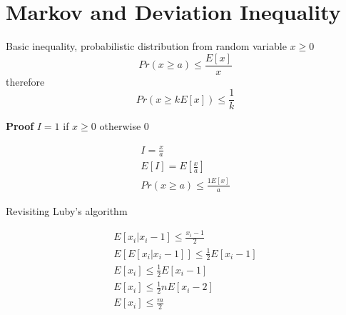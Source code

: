 \section*{Markov and Deviation Inequality}
Basic inequality, probabilistic distribution from random variable $x \geq 0$
\[
Pr(x \geq a) \leq \frac{E[x]}{x}
\]
therefore
\[
Pr(x \geq k E[x]) \leq \frac{1}{k}
\]

\textbf{Proof}
$I = 1$ if $x \geq 0$ otherwise $0$

\[
\begin{aligned}
    I = \frac{x}{a} \\
    E[I] = E[\frac{x}{a}] \\
    Pr(x\geq a) \leq \frac{1 E[x]}{a}
    
\end{aligned}
\]

Revisiting Luby's algorithm

\[
\begin{aligned}
E[x_i | x_i - 1] \leq \frac{x_i - 1}{2} \\ 
E[E[x_i | x_i - 1]] \leq \frac{1}{2} E[x_i - 1] \\
E[x_i] \leq \frac{1}{2} E[x_i - 1] \\
E[x_i] \leq \frac{1}{2}n E[x_i-2] \\
E[x_i] \leq \frac{m}{2}
\end{aligned}
\]